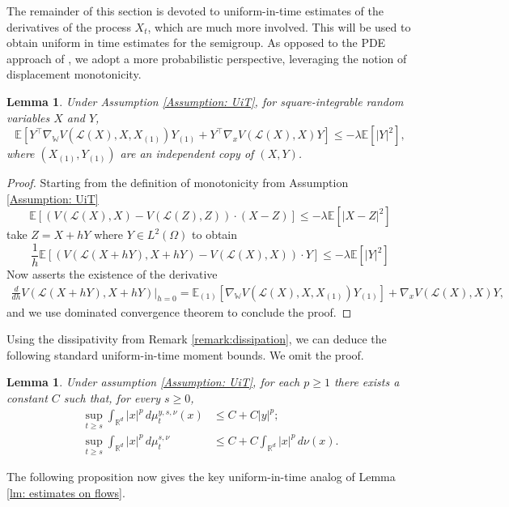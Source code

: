 \documentclass[11pt,reqno]{amsart}
\numberwithin{equation}{section}
\newtheorem{lemma}[theorem]{Lemma}
\theoremstyle{definition}
\def\E{{\mathbb E}}
\def\R{{\mathbb R}}
\def\Law{\mathcal{L}}
\newcommand{\wgrad}{\nabla_{\W}}
\newcommand{\W}{\mathbb W}
\begin{document}
The remainder of this section is devoted to uniform-in-time estimates of the derivatives of the process $X_t$, which are much more involved. This will be used to obtain uniform in time estimates for the semigroup. As opposed to the PDE approach of \cite{UiTWeakChaos}, we adopt a more probabilistic perspective, leveraging the notion of displacement monotonicity. 
\begin{lemma} \label{lem:monotonicity}
    Under Assumption \ref{Assumption: UiT}, for square-integrable random variables $X$ and $Y$, 
    \begin{equation}
    \label{eq: wasserstein gradient is PD}
        \E[Y^\top \wgrad V(\Law(X),X,X_{(1)})Y_{(1)}+Y^\top \nabla_x V (\Law(X),X)Y ]\leq -\lambda \E[|Y|^2],
    \end{equation}
    where $(X_{(1)},Y_{(1)})$ are an independent copy of $(X,Y)$.
\end{lemma}
\begin{proof}
    Starting from the definition of monotonicity from Assumption \ref{Assumption: UiT}
    \[\E[(V(\Law(X),X)-V(\Law(Z),Z))\cdot (X-Z)]\leq -\lambda \E[|X-Z|^2]\]
    take $Z=X+hY$ where $Y\in L^2(\Omega)$ to obtain
     \[\frac 1h\E[(V(\Law(X+hY),X+hY)-V(\Law(X),X))\cdot Y]\leq-\lambda \E[|Y|^2]\]
Now \cite[Proposition 5.85]{Carmonabook1} asserts the existence of the derivative
\begin{align*}
    \frac{d}{dh}V(\Law(X+hY),X+hY)\Big \vert_{h=0}=\E_{(1)}[\wgrad V(\Law(X),X,X_{(1)})Y_{(1)}]+ \nabla_x V(\Law(X),X)Y,
\end{align*}
and we use  dominated convergence theorem to conclude the proof.
\end{proof}

Using the dissipativity from Remark \ref{remark:dissipation}, we can deduce the following standard uniform-in-time moment bounds. We omit the proof.
\begin{lemma} \label{lem:flow moment bounds UIT}
    Under assumption \ref{Assumption: UiT}, for each $p\geq 1$ there exists a constant $C$ such that, for every $s \ge 0$, 
    \begin{align*}
        \sup_{t\geq s}\int_{\R^d}|x|^p\,d\mu_t^{y,s,\nu}(x)&\leq C+C |y|^p;\\
        \sup_{t\geq s}\int_{\R^d}|x|^p\,d\mu_t^{s,\nu}&\leq C+C \int_{\R^d}|x|^p\,d\nu(x). 
    \end{align*}
\end{lemma}

The following proposition now gives the key uniform-in-time analog of Lemma \ref{lm: estimates on flows}. 
\end{document}
